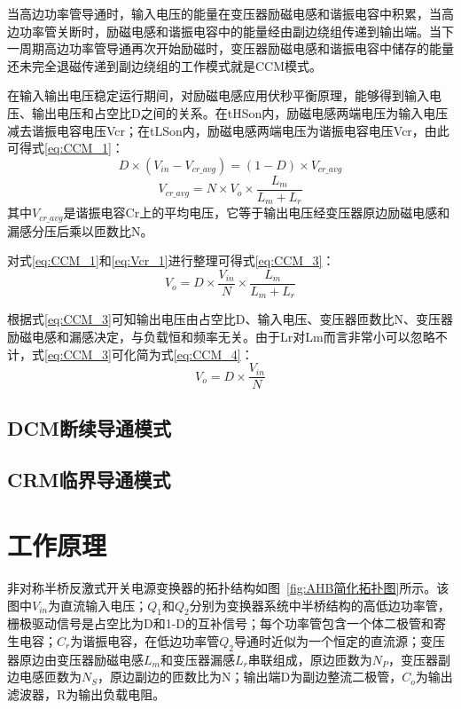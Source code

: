 当高边功率管导通时，输入电压的能量在变压器励磁电感和谐振电容中积累，当高边功率管关断时，励磁电感和谐振电容中的能量经由副边绕组传递到输出端。当下一周期高边功率管导通再次开始励磁时，变压器励磁电感和谐振电容中储存的能量还未完全退磁传递到副边绕组的工作模式就是CCM模式。

在输入输出电压稳定运行期间，对励磁电感应用伏秒平衡原理，能够得到输入电压、输出电压和占空比D之间的关系。在tHSon内，励磁电感两端电压为输入电压减去谐振电容电压Vcr；在tLSon内，励磁电感两端电压为谐振电容电压Vcr，由此可得式\eqref{eq:CCM_1}：
\begin{equation}
    \label{eq:CCM_1}
    D\times(V_{in}−V_{cr\_avg})=(1−D)\times V_{cr\_avg}
\end{equation}
\begin{equation}
    \label{eq:Vcr_1}
    V_{cr\_avg}=N \times V_o\times\frac{L_m}{L_m+L_r}
\end{equation}
其中$V_{cr\_avg}$是谐振电容Cr上的平均电压，它等于输出电压经变压器原边励磁电感和漏感分压后乘以匝数比N。

对式\eqref{eq:CCM_1}和\eqref{eq:Vcr_1}进行整理可得式\eqref{eq:CCM_3}：
\begin{equation}
    \label{eq:CCM_3}
    V_o=D \times \frac{V_{in}}{N} \times\frac{L_m}{L_m+L_r}  
\end{equation}

根据式\eqref{eq:CCM_3}可知输出电压由占空比D、输入电压、变压器匝数比N、变压器励磁电感和漏感决定，与负载恒和频率无关。由于Lr对Lm而言非常小可以忽略不计，式\eqref{eq:CCM_3}可化简为式\eqref{eq:CCM_4}：
\begin{equation}
    \label{eq:CCM_4}
    V_o=D \times \frac{V_{in}}{N}  
\end{equation}

\subsection{DCM断续导通模式}




\subsection{CRM临界导通模式}


\section{工作原理}

非对称半桥反激式开关电源变换器的拓扑结构如图~\ref{fig:AHB简化拓扑图}所示。该图中$V_{in}$为直流输入电压；$Q_1$和$Q_2$分别为变换器系统中半桥结构的高低边功率管，栅极驱动信号是占空比为D和1-D的互补信号；每个功率管包含一个体二极管和寄生电容；$C_r$为谐振电容，在低边功率管$Q_2$导通时近似为一个恒定的直流源；变压器原边由变压器励磁电感$L_m$和变压器漏感$L_r$串联组成，原边匝数为$N_P$，变压器副边电感匝数为$N_S$，原边副边的匝数比为N；输出端D为副边整流二极管，$C_o$为输出滤波器，R为输出负载电阻。

